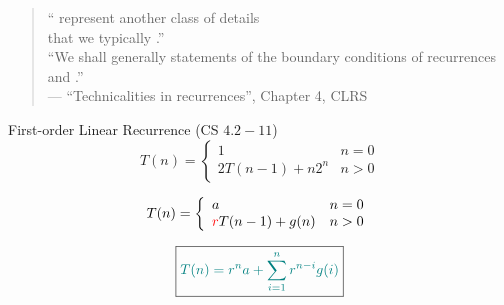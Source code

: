 
\begin{frame}{}
  \centerline{}

\end{frame}

% 

\begin{frame}{}

  \vspace{0.30cm}
  \centerline{}

  \pause
  \vspace{0.30cm}
  \begin{quote}
    \centering
    `` represent another class of details \\
    that we typically .''  \\[6pt]

    ``We shall generally  statements of the boundary conditions of recurrences 
    and .'' \\[6pt]

    \hfill --- ``Technicalities in recurrences'', Chapter 4, CLRS
  \end{quote}

  \pause
  \vspace{0.30cm}
  \centerline{}
\end{frame}

\begin{frame}{}
  \begin{exampleblock}{First-order Linear Recurrence (CS $4.2-11$)}
    \[
      T(n) = \left\{\begin{array}{lr}
	1		& n = 0 \\
	2T(n-1) + n 2^n & n > 0 
      \end{array}\right.
    \]
  \end{exampleblock}

  \pause
  \vspace{0.50cm}
  \begin{theorem}
    \[
      T(n) = \left\{\begin{array}{lr}
	a		& n = 0 \\
	\textcolor{red}{r}T(n-1) + g(n) & n > 0 
      \end{array}\right.
    \]

    \pause
    \vspace{0.30cm}
    \[
      \boxed{\textcolor{teal}{T(n) = r^n a + \sum_{i=1}^{n} r^{n-i} g(i)}}
    \]
  \end{theorem}
\end{frame}

